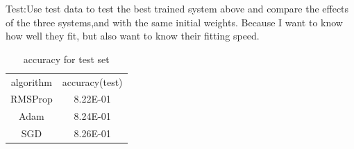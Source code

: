 \documentclass{article}
\begin{document}
Test:Use test data to test the best trained system above and compare the effects of the three systems,and with the same initial weights.
Because I want to know how well they fit, but also want to know their fitting speed.


\begin{figure}[H]\label{q2:rmspandadam}
	\centering  %
	\label{Fig.main}
\end{figure}

\begin{figure}[H]\label{q2:sgd}
	\centering  %
	\label{Fig.main}
\end{figure}

\begin{table}[htbp]
  \centering
  \caption{accuracy for test set}\label{q2:test}
    \begin{tabular}{|c|c|}
    \toprule
    \multirow{2}[2]{*}{algorithm} & \multirow{2}[2]{*}{accuracy(test)} \\
          &  \\
    \midrule
    \multicolumn{1}{|c|}{\multirow{2}[2]{*}{RMSProp}} & \multirow{2}[2]{*}{8.22E-01} \\
          &  \\
    \midrule
    \multicolumn{1}{|c|}{\multirow{2}[2]{*}{Adam}} & \multirow{2}[2]{*}{8.24E-01} \\
          &  \\
    \midrule
    \multicolumn{1}{|c|}{\multirow{2}[2]{*}{SGD}} & \multirow{2}[2]{*}{8.26E-01} \\
          &  \\
    \bottomrule
    \end{tabular}%
  \label{tab:addlabel}%
\end{table}%
\end{document}
